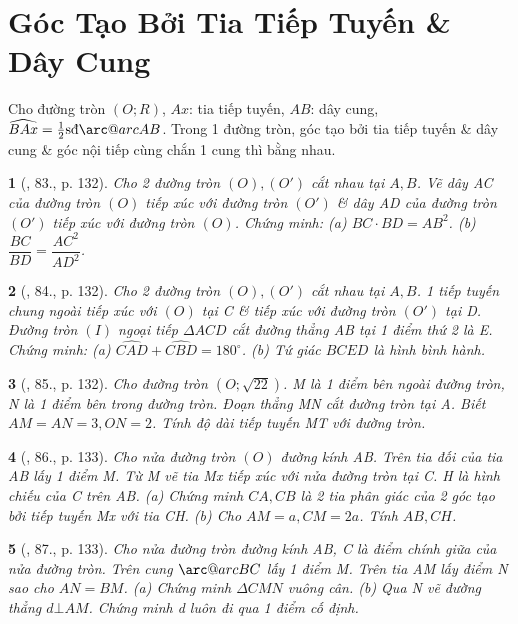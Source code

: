 \documentclass{article}
\makeatletter
\newcommand{\arc@char}{{\usefont{U}{tipa}{m}{n}\symbol{62}}}%
\newcommand{\arc}[1]{\mathpalette\arc@arc{#1}}
\newcommand{\arc@arc}[2]{%
	\sbox0{$\m@th#1#2$}%
	\vbox{
		\hbox{\resizebox{\wd0}{\height}{\arc@char}}
		\nointerlineskip
		\box0
	}%
}
\newtheorem{baitoan}{}
\makeatother
\begin{document}

\section{Góc Tạo Bởi Tia Tiếp Tuyến \& Dây Cung}
 Cho đường tròn $(O;R)$, $Ax$: tia tiếp tuyến, $AB$: dây cung, $\widehat{BAx} = \frac{1}{2}\mbox{\rm sđ}\arc{AB}$.  Trong 1 đường tròn, góc tạo bởi tia tiếp tuyến \& dây cung \& góc nội tiếp cùng chắn 1 cung thì bằng nhau.

\begin{baitoan}[\cite{Tuyen_Toan_9_old}, 83., p. 132]
	Cho 2 đường tròn $(O),(O')$ cắt nhau tại $A,B$. Vẽ dây AC của đường tròn $(O)$ tiếp xúc với đường tròn $(O')$ \& dây AD của đường tròn $(O')$ tiếp xúc với đường tròn $(O)$. Chứng minh: (a) $BC\cdot BD = AB^2$. (b) $\dfrac{BC}{BD} = \dfrac{AC^2}{AD^2}$.
\end{baitoan}

\begin{baitoan}[\cite{Tuyen_Toan_9_old}, 84., p. 132]
	Cho 2 đường tròn $(O),(O')$ cắt nhau tại $A,B$. 1 tiếp tuyến chung ngoài tiếp xúc với $(O)$ tại C \& tiếp xúc với đường tròn $(O')$ tại D. Đường tròn $(I)$ ngoại tiếp $\Delta ACD$ cắt đường thẳng AB tại 1 điểm thứ 2 là E. Chứng minh: (a) $\widehat{CAD} + \widehat{CBD} = 180^\circ$. (b) Tứ giác $BCED$ là hình bình hành.
\end{baitoan}

\begin{baitoan}[\cite{Tuyen_Toan_9_old}, 85., p. 132]
	Cho đường tròn $(O;\sqrt{22})$. M là 1 điểm bên ngoài đường tròn, N là 1 điểm bên trong đường tròn. Đoạn thẳng MN cắt đường tròn tại A. Biết $AM = AN = 3,ON = 2$. Tính độ dài tiếp tuyến MT với đường tròn.
\end{baitoan}

\begin{baitoan}[\cite{Tuyen_Toan_9_old}, 86., p. 133]
	Cho nửa đường tròn $(O)$ đường kính AB. Trên tia đối của tia AB lấy 1 điểm M. Từ M vẽ tia Mx tiếp xúc với nửa đường tròn tại C. H là hình chiếu của C trên AB. (a) Chứng minh $CA,CB$ là 2 tia phân giác của 2 góc tạo bởi tiếp tuyến Mx với tia CH. (b) Cho $AM = a,CM = 2a$. Tính $AB,CH$.
\end{baitoan}

\begin{baitoan}[\cite{Tuyen_Toan_9_old}, 87., p. 133]
	Cho nửa đường tròn đường kính AB, C là điểm chính giữa của nửa đường tròn. Trên cung $\arc{BC}$ lấy 1 điểm M. Trên tia AM lấy điểm N sao cho $AN = BM$. (a) Chứng minh $\Delta CMN$ vuông cân. (b) Qua N vẽ đường thẳng $d\bot AM$. Chứng minh d luôn đi qua 1 điểm cố định.
\end{baitoan}
\end{document}
